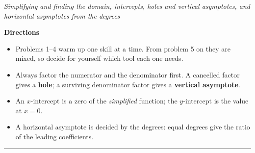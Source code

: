 \documentclass[12pt]{article}
\begin{document}

\begin{center}
\textit{Simplifying and finding the domain, intercepts, holes and vertical asymptotes, and horizontal asymptotes from the degrees}
\end{center}

\noindent\textbf{Directions}
\begin{itemize}[leftmargin=1.1cm, itemsep=1pt, topsep=3pt]
  \item Problems 1--4 warm up one skill at a time. From problem 5 on they are mixed, so decide for yourself which tool each one needs.
  \item Always factor the numerator and the denominator first. A cancelled factor gives a \textbf{hole}; a surviving denominator factor gives a \textbf{vertical asymptote}.
  \item An $x$-intercept is a zero of the \emph{simplified} function; the $y$-intercept is the value at $x = 0$.
  \item A horizontal asymptote is decided by the degrees: equal degrees give the ratio of the leading coefficients.
\end{itemize}

\vspace{0.2cm}
\noindent\rule{\linewidth}{0.4pt}





\end{document}
